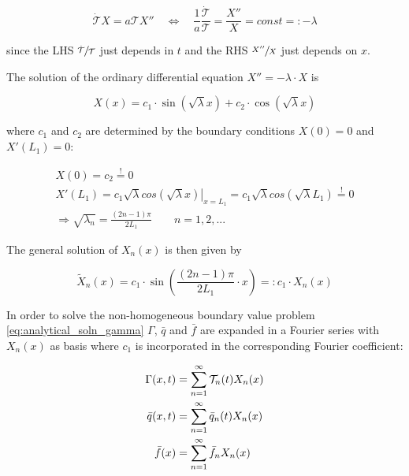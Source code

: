 \documentclass{scrartcl}[12pt, halfparskip]
\numberwithin{equation}{section}
\numberwithin{figure}{section}
\numberwithin{table}{section}
\begin{document}
\begin{equation}
	\dot{\mathcal{T}} X = a \mathcal{T} X'' \quad \Leftrightarrow \quad \frac{1}{a} \frac{\dot{\mathcal{T}}}{\mathcal{T}} = \frac{X''}{X} = const =: - \lambda
\end{equation}


since the LHS $\sfrac{\dot{\mathcal{T}}}{{\mathcal{T}}}$ just depends in $t$ and the RHS $\sfrac{X''}{X}$ just depends on $x$. 

The solution of the ordinary differential equation $X'' = - \lambda \cdot X$ is

\begin{equation}
	X(x) = c_1 \cdot \sin(\sqrt{\lambda} x) + c_2 \cdot \cos(\sqrt{\lambda} x)
\end{equation}

where $c_1$ and $c_2$ are determined by the boundary conditions $X(0) = 0$ and $X'(L_1) = 0$:

\begin{align}
	X(0) = c_2 \stackrel{!}{=} 0 \\
	X'(L_1) = \left. c_1 \sqrt{\lambda} cos(\sqrt{\lambda} x) \right|_{x=L_1} = c_1 \sqrt{\lambda} cos(\sqrt{\lambda} L_1) \stackrel{!}{=} 0 \\
	\Rightarrow \sqrt{\lambda_n} = \frac{(2n -1)\pi}{2 L_1} \qquad n=1,2,...
\end{align}

The general solution of $X_n(x)$ is then given by

\begin{equation}
	\tilde{X}_n(x) = c_1 \cdot \sin\left(\frac{(2n -1)\pi}{2 L_1} \cdot x\right) =: c_1 \cdot X_n(x)
\end{equation}

In order to solve the non-homogeneous boundary value problem \cref{eq:analytical_soln_gamma} $\Gamma$, $\bar{q}$ and $\bar{f}$ are expanded in a Fourier series with $X_n(x)$ as basis where $c_1$ is incorporated in the corresponding Fourier coefficient:

\begin{subequations}
	\centering
	\begin{align}
		\Gamma(x,t) & = \sum_{n=1}^{\infty} \mathcal{T}_n(t) X_n(x) \\
		\bar{q}(x,t) & = \sum_{n=1}^{\infty} \bar{q}_n(t) X_n(x) \\
		\bar{f}(x) & = \sum_{n=1}^{\infty} \bar{f}_n X_n(x)
	\end{align}
\end{subequations}
\end{document}
